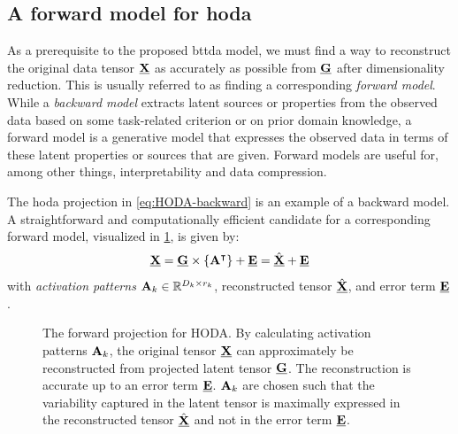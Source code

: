 \documentclass[10pt]{iopart}
\begin{document}
\subsection{A forward model for \acs{hoda}}
As a prerequisite to the proposed \ac{bttda} model, we must find a
way to reconstruct the original data tensor $\underline{\mathbf{X}}$ as accurately as possible
from $\underline{\mathbf{G}}$ after dimensionality reduction.
This is usually referred to as finding a corresponding \emph{forward model}.
While a \emph{backward model} extracts latent sources or properties from the observed
data based on some task-related criterion or on prior domain knowledge,
a forward model is a generative model that expresses the observed data in
terms of these latent properties or sources that are given.
Forward models are useful for, among other things, interpretability and data compression.

The \ac{hoda} projection in \cref{eq:HODA-backward} is an example
of a backward model.
A straightforward and computationally efficient candidate for a corresponding
forward model, visualized in \cref{fig:HODA-forward}, is given by:
\begin{equation}
  \underline{\mathbf{X}} = \underline{\mathbf{G}}\times\left\{\mathbf{A}^\intercal\right\} + \underline{\mathbf{E}} =
  \hat{\underline{\mathbf{X}}} + \underline{\mathbf{E}}
	\label{eq:HODA-forward}
\end{equation}
with \emph{activation patterns} $\mathbf{A}_k \in \mathbb{R}^{D_k\times r_k}$,
reconstructed tensor $\hat{\underline{\mathbf{X}}}$, and error term $\underline{\mathbf{E}}$.
\begin{figure}[t]
  \centering
	
  \caption[A forward projection for \ac{hoda}.]{The forward projection for HODA.
    By calculating activation patterns $\mathbf{A}_k$, the original tensor $\underline{\mathbf{X}}$ can approximately be
    reconstructed from projected latent tensor $\underline{\mathbf{G}}$.
    The reconstruction is accurate up to an error term $\underline{\mathbf{E}}$.
    $\mathbf{A}_k$ are chosen such that the variability captured in the latent tensor is
    maximally expressed in the reconstructed tensor $\hat{\underline{\mathbf{X}}}$ and not in
    the error term $\underline{\mathbf{E}}$.}
	\label{fig:HODA-forward}
\end{figure}
\end{document}
